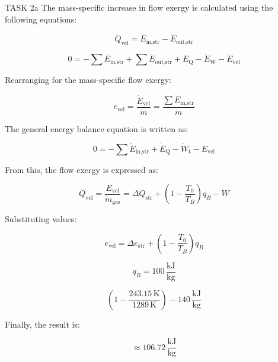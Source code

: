 TASK 2a  
The mass-specific increase in flow exergy is calculated using the following equations:  

\[
\dot{Q}_{\text{vel}} = \dot{E}_{\text{in,str}} - \dot{E}_{\text{out,str}}
\]

\[
0 = -\sum \dot{E}_{\text{in,str}} + \sum \dot{E}_{\text{out,str}} + \dot{E}_{\text{Q}} - \dot{E}_{\text{W}} - \dot{E}_{\text{vel}}
\]

Rearranging for the mass-specific flow exergy:  

\[
e_{\text{vel}} = \frac{\dot{E}_{\text{vel}}}{\dot{m}} = \frac{\sum \dot{E}_{\text{in,str}}}{\dot{m}}
\]

The general energy balance equation is written as:  

\[
0 = -\sum \dot{E}_{\text{in,str}} + \dot{E}_{\text{Q}} - \dot{W}_{\text{t}} - E_{\text{vel}}
\]

From this, the flow exergy is expressed as:  

\[
\dot{Q}_{\text{vel}} = \frac{E_{\text{vel}}}{\dot{m}_{\text{ges}}} = \Delta Q_{\text{str}} + \left(1 - \frac{T_0}{T_B}\right) q_B - \dot{W}
\]

Substituting values:  

\[
e_{\text{vel}} = \Delta e_{\text{str}} + \left(1 - \frac{T_0}{T_B}\right) q_B
\]

\[
q_B = 100 \, \frac{\text{kJ}}{\text{kg}}
\]

\[
\left(1 - \frac{243.15 \, \text{K}}{1289 \, \text{K}}\right) - 140 \, \frac{\text{kJ}}{\text{kg}}
\]

Finally, the result is:  

\[
\approx 106.72 \, \frac{\text{kJ}}{\text{kg}}
\]